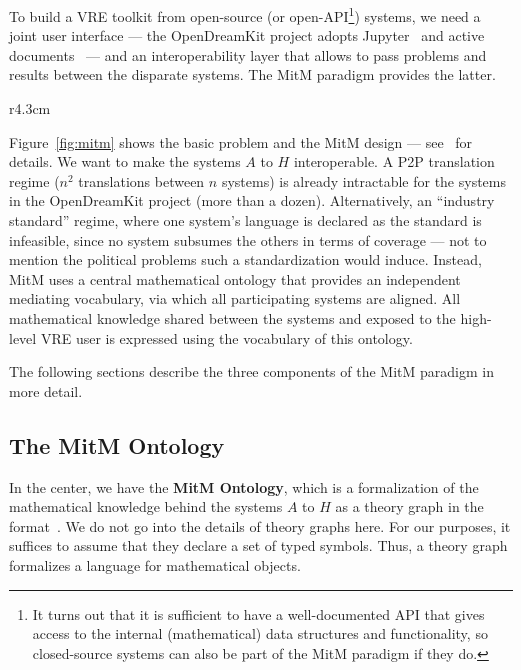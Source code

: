 To build a VRE toolkit from open-source (or open-API\footnote{It turns out that it is
  sufficient to have a well-documented API that gives access to the internal
  (mathematical) data structures and functionality, so closed-source systems can also be
  part of the MitM paradigm if they do.}) systems, we need a joint user interface --- the
OpenDreamKit project adopts Jupyter~\cite{jupyter-project:on} and active
documents~\cite{KohDavGin:psewads11} --- and an interoperability layer that allows to pass
problems and results between the disparate systems. 
The MitM paradigm provides the latter.

\begin{wrapfigure}r{4.3cm}\vspace*{-2em}
  \vspace*{-1em}
  \caption{MitM Paradigm}\label{fig:mitm}\vspace*{-1.5em}
\end{wrapfigure}
Figure~\ref{fig:mitm} shows the basic problem and the MitM design --- see~\cite{DehKohKon:iop16} for details.
We want to make the systems $A$ to $H$ interoperable.
A P2P translation regime ($n^2$ translations between $n$ systems) is already intractable for the systems in the OpenDreamKit project (more than a dozen).
Alternatively, an ``industry standard'' regime, where one system's language is declared as the standard is infeasible, since no system subsumes the others in terms of coverage --- not to mention the political problems such a standardization would induce.
Instead, MitM uses a central mathematical ontology that provides an independent mediating vocabulary, via which all participating systems are aligned.
All mathematical knowledge shared between the systems and exposed to the high-level VRE user is expressed using the vocabulary of this ontology.

The following sections describe the three components of the MitM paradigm in more detail.

\subsection{The MitM Ontology}\label{sec:mitm:recap}

In the center, we have the \textbf{MitM Ontology}, which is a formalization of the mathematical knowledge behind the systems $A$ to $H$ as a theory graph in the \OMMT format~\cite{Kohlhase:OMDoc1.2,RabKoh:WSMSML13,uniformal:on}.
We do not go into the details of \OMMT theory graphs here.
For our purposes, it suffices to assume that they declare a set of typed symbols.
Thus, a theory graph formalizes a language for mathematical objects.

